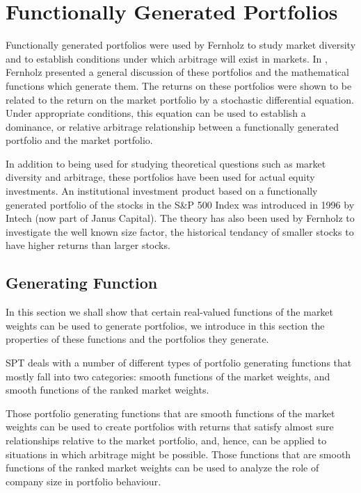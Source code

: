 \documentclass[british]{amsart} \usepackage{lmodern}
\numberwithin{equation}{section} \numberwithin{figure}{section}
\theoremstyle{plain} \newtheorem{thm}{\protect\theoremname}[section]
\theoremstyle{definition} \newtheorem{defn}[thm]{\protect\definitionname}
\theoremstyle{plain} \newtheorem{assumption}[thm]{\protect\assumptionname}
\theoremstyle{plain} \newtheorem{lem}[thm]{\protect\lemmaname}
\theoremstyle{plain} \newtheorem{prop}[thm]{\protect\propositionname}
\theoremstyle{remark} \newtheorem{rem}[thm]{\protect\remarkname}
\theoremstyle{plain} \newtheorem{cor}[thm]{\protect\corollaryname}
\begin{document}
\newpage
\section{Functionally Generated Portfolios}

Functionally generated portfolios were used by Fernholz
\cite{fernholz1999diversity} to study market diversity and to establish
conditions under which arbitrage will exist in markets. In
\cite{fernholz1999pgf}, Fernholz presented a general discussion of these
portfolios and the mathematical functions which generate them. The returns on
these portfolios were shown to be related to the return on the market portfolio
by a stochastic differential equation. Under appropriate conditions, this
equation can be used to establish a dominance, or relative arbitrage
relationship between a functionally generated portfolio and the market
portfolio.

In addition to being used for studying theoretical questions such as market
diversity and arbitrage, these portfolios have been used for actual equity
investments. An institutional investment product based on a functionally
generated portfolio of the stocks in the S&P 500 Index was introduced in 1996 by
Intech (now part of Janus Capital). The theory has also been used by Fernholz
\cite{fernholz1999diversity} to investigate the well known size factor, the
historical tendancy of smaller stocks to have higher returns than larger stocks.

\subsection{Generating Function}

In this section we shall show that certain real-valued functions of the market
weights can be used to generate portfolios, we introduce in this section the
properties of these functions and the portfolios they generate. 

SPT deals with a number of different types of portfolio generating functions
that mostly fall into two categories: smooth functions of the market weights, 
and smooth functions of the ranked market weights. 

Those portfolio generating functions that are smooth functions of the market
weights can be used to create portfolios with returns that satisfy almost sure
relationships relative to the market portfolio, and, hence, can be applied to
situations in which arbitrage might be possible. Those functions that are smooth
functions of the ranked market weights can be used to analyze the role of
company size in portfolio behaviour.
\end{document}
